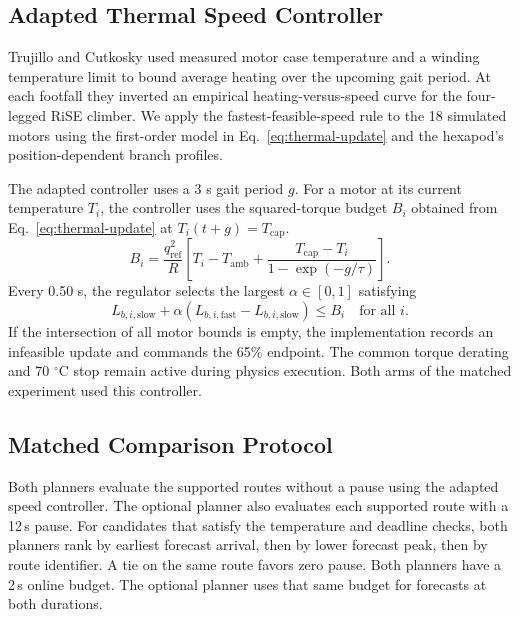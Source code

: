 \documentclass{ieeeaccess}
\begin{document}
\subsection{Adapted Thermal Speed Controller}

Trujillo and Cutkosky \cite[Sec.~III-D, Eq.~(8)]{trujillo2009} used measured motor case temperature and a winding temperature limit to bound average heating over the upcoming gait period. At each footfall they inverted an empirical heating-versus-speed curve for the four-legged RiSE climber. We apply the fastest-feasible-speed rule to the 18 simulated motors using the first-order model in Eq.~\eqref{eq:thermal-update} and the hexapod's position-dependent branch profiles.

The adapted controller uses a 3 s gait period $g$. For a motor at its current temperature $T_i$, the controller uses the squared-torque budget $B_i$ obtained from Eq.~\eqref{eq:thermal-update} at $T_i(t+g)=T_{\mathrm{cap}}$.
\begin{equation}
B_i = \frac{q_{\mathrm{ref}}^2}{R}
    \left[T_i-T_{\mathrm{amb}}
      +\frac{T_{\mathrm{cap}}-T_i}{1-\exp(-g/\tau)}\right].
\label{eq:squared-torque-budget}
\end{equation}
Every 0.50 s, the regulator selects the largest $\alpha\in[0,1]$ satisfying
\begin{equation}
L_{b,i,\mathrm{slow}}+\alpha
  (L_{b,i,\mathrm{fast}}-L_{b,i,\mathrm{slow}})\leq B_i
  \quad\text{for all }i .
\label{eq:speed-constraints}
\end{equation}
If the intersection of all motor bounds is empty, the implementation records an infeasible update and commands the 65\% endpoint. The common torque derating and 70 \ensuremath{{}^{\circ}\mathrm{C}} stop remain active during physics execution. Both arms of the matched experiment used this controller.


\subsection{Matched Comparison Protocol}
\label{sec:matched-methods}

Both planners evaluate the supported routes without a pause using the adapted speed controller. The optional planner also evaluates each supported route with a 12\,s pause. For candidates that satisfy the temperature and deadline checks, both planners rank by earliest forecast arrival, then by lower forecast peak, then by route identifier. A tie on the same route favors zero pause. Both planners have a 2\,s online budget. The optional planner uses that same budget for forecasts at both durations.
\end{document}
